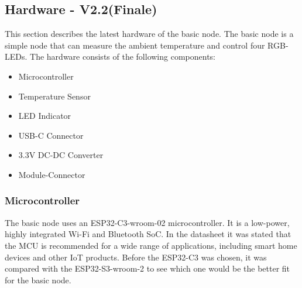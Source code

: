 \subsection{Hardware - V2.2(Finale)}


    This section describes the latest hardware of the basic node. The basic node is a 
    simple node that can measure the ambient temperature and control four RGB-LEDs.
    The hardware consists of the following components:

    \begin{itemize}
        \item Microcontroller
        \item Temperature Sensor
        \item LED Indicator
        \item USB-C Connector
        \item 3.3V DC-DC Converter
        \item Module-Connector
    \end{itemize}

    \subsubsection{Microcontroller}
        The basic node uses an ESP32-C3-wroom-02 \cite{noauthor_esp32-c3_2023} microcontroller. 
        It is a low-power, highly integrated Wi-Fi and Bluetooth SoC. In the datasheet 
        it was stated that the MCU is recommended for a wide range of applications, including smart home devices 
        and other IoT products.
        Before the ESP32-C3 was chosen, it was compared with the ESP32-S3-wroom-2 to see which one
        would be the better fit for the basic node. 

        \vspace{0.5cm}
        \begin{Parallel}{0.45\textwidth}{0.45\textwidth}
            \ParallelPar
        \end{Parallel}

